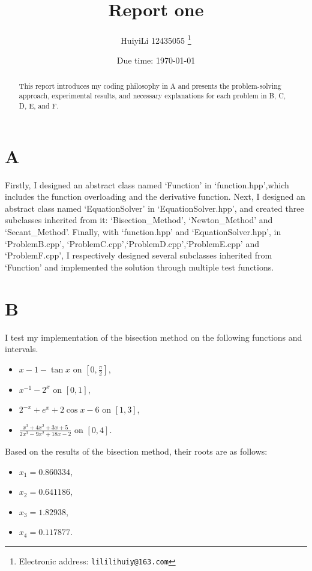 \documentclass[a4paper]{article}
\begin{document}
\title{Report one}

\author{HuiyiLi 12435055
  \thanks{Electronic address: \texttt{lililihuiy@163.com}}}


\date{Due time: \today}

\maketitle
 \begin{abstract}
  This report introduces my coding philosophy in A and presents the problem-solving approach, experimental results, and necessary explanations for each problem in B, C, D, E, and F.     
\end{abstract} 


\section{A}
Firstly, I designed an abstract class named `Function' in `function.hpp',which includes the function overloading
 and the derivative function. Next, I designed an abstract class named `EquationSolver' in `EquationSolver.hpp', 
and created three subclasses inherited from it: `Bisection\_Method', `Newton\_Method' and `Secant\_Method'.
 Finally, with `function.hpp' and `EquationSolver.hpp', in `ProblemB.cpp', `ProblemC.cpp',`ProblemD.cpp',`ProblemE.cpp' and `ProblemF.cpp',
I respectively designed several subclasses inherited from `Function' and implemented the solution
through multiple test functions.

\section{B}
I test my implementation of the bisection method on the following functions and intervals.
\begin{itemize}
  \item \( x - 1 - \tan x \) on \([0, \frac{\pi}{2}]\),
  \item \( x^{-1} - 2^x \) on \([0, 1]\),
  \item \( 2^{-x} + e^x + 2 \cos x - 6 \) on \([1, 3]\),
  \item \( \frac{x^3 + 4x^2 + 3x + 5}{2x^3 - 9x^2 + 18x - 2} \) on \([0, 4]\).
\end{itemize}
Based on the results of the bisection method, their roots are as follows:
\begin{itemize}
  \item $x_1 = 0.860334$,
  \item $x_2 = 0.641186$,
  \item $x_3 = 1.82938$,
  \item $x_4 = 0.117877$.
\end{itemize}
\end{document}
